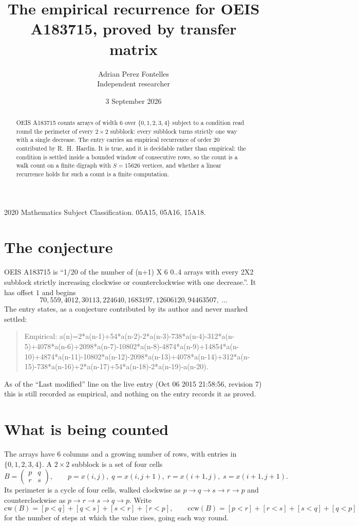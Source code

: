 \documentclass[11pt,a4paper]{article}
\title{The empirical recurrence for OEIS A183715, proved by transfer matrix}
\author{Adrian Perez Fontelles\\ \small Independent researcher}
\date{3 September 2026}
\theoremstyle{plain}
\theoremstyle{definition}
\begin{document}
\maketitle

\begin{abstract}
OEIS A183715 counts arrays of width $6$ over $\{0,1,2,3,4\}$ subject to a condition read round the
perimeter of every $2\times2$ subblock: every subblock turns strictly one way with a single decrease. The entry carries an empirical recurrence of
order $20$ contributed by R.~H.~Hardin. It is true, and it is decidable rather than
empirical: the condition is settled inside a bounded window of consecutive rows, so the
count is a walk count on a finite digraph with $S=15626$ vertices, and whether a linear
recurrence holds for such a count is a finite computation.
\end{abstract}

\noindent\small 2020 Mathematics Subject Classification. 05A15, 05A16, 15A18.\normalsize

\section{The conjecture}

OEIS A183715 is ``1/20 of the number of (n+1) X 6 0..4 arrays with every 2X2 subblock strictly increasing clockwise or counterclockwise with one decrease.''. It has offset $1$ and begins
\[
70, 559, 4012, 30113, 224640, 1683197, 12606120, 94463507,\ \dots
\]
The entry states, as a conjecture contributed by its author and never marked settled:
\begin{quote}
Empirical: a(n)=2*a(n-1)+54*a(n-2)-2*a(n-3)-738*a(n-4)-312*a(n-5)+4078*a(n-6)+2098*a(n-7)-10802*a(n-8)-4874*a(n-9)+14854*a(n-10)+4874*a(n-11)-10802*a(n-12)-2098*a(n-13)+4078*a(n-14)+312*a(n-15)-738*a(n-16)+2*a(n-17)+54*a(n-18)-2*a(n-19)-a(n-20).
\end{quote}
As of the ``Last modified'' line on the live entry (Oct 06 2015 21:58:56, revision 7) this is still
recorded as empirical, and nothing on the entry records it as proved.

\section{What is being counted}

The arrays have $6$ columns and a growing number of rows, with entries in $\{0,1,2,3,4\}$. A
$2\times2$ subblock is a set of four cells
\[
B=\begin{pmatrix} p & q \\ r & s \end{pmatrix},
\qquad p=x(i,j),\; q=x(i,j+1),\; r=x(i+1,j),\; s=x(i+1,j+1).
\]
Its perimeter is a cycle of four cells, walked clockwise as $p\to q\to s\to r\to p$ and
counterclockwise as $p\to r\to s\to q\to p$. Write
\[
\mathrm{cw}(B)=[p<q]+[q<s]+[s<r]+[r<p],\qquad
\mathrm{ccw}(B)=[p<r]+[r<s]+[s<q]+[q<p]
\]
for the number of steps at which the value rises, going each way round.
\end{document}

